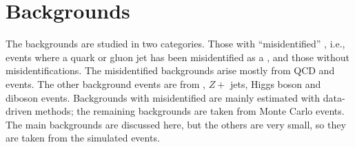 \section{Backgrounds}
\label{sect:bkg}
The backgrounds are studied in two categories. Those with 
``misidentified'' \Tau, i.e., events where a quark or gluon jet has been misidentified
as a \Tau, and those without \Tau misidentifications.  
The misidentified \Tau backgrounds arise mostly from QCD and \wjets events.  The 
other background events are from \ttbar, $Z+$ jets, Higgs boson and diboson events.
Backgrounds with misidentified \Tau are mainly estimated with data-driven methods; the 
remaining backgrounds are taken from Monte Carlo events. The main backgrounds
are discussed here, but the others are very small, so they are  taken from the simulated events.


